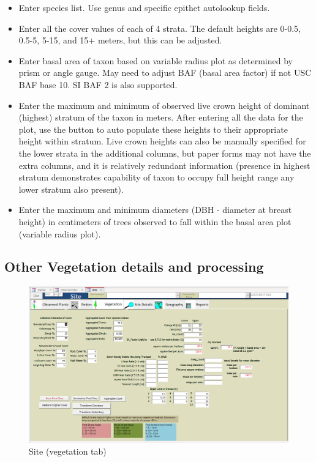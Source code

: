 \documentclass[
]{book}
\begin{document}
\begin{itemize}
\item
  Enter species list. Use genus and specific epithet autolookup fields.
\item
  Enter all the cover values of each of 4 strata. The default heights are 0-0.5, 0.5-5, 5-15, and 15+ meters, but this can be adjusted.
\item
  Enter basal area of taxon based on variable radius plot as determined by prism or angle gauge. May need to adjust BAF (basal area factor) if not USC BAF base 10. SI BAF 2 is also supported.
\item
  Enter the maximum and minimum of observed live crown height of dominant (highest) stratum of the taxon in meters. After entering all the data for the plot, use the button to auto populate these heights to their appropriate height within stratum. Live crown heights can also be manually specified for the lower strata in the additional columns, but paper forms may not have the extra columns, and it is relatively redundant information (presence in highest stratum demonstrates capability of taxon to occupy full height range any lower stratum also present).
\item
  Enter the maximum and minimum diameters (DBH - diameter at breast height) in centimeters of trees observed to fall within the basal area plot (variable radius plot).
\end{itemize}

\hypertarget{other-vegetation-details-and-processing}{%
\subsection*{Other Vegetation details and processing}\label{other-vegetation-details-and-processing}}

\begin{figure}
\centering
\includegraphics{static-figures/veglog4.png}
\caption{Site (vegetation tab)}
\end{figure}
\end{document}
